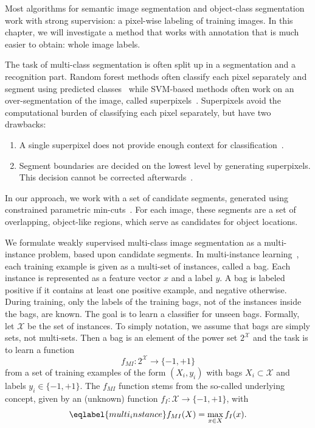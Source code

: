 Most algorithms for semantic image segmentation and object-class segmentation work with strong supervision: a pixel-wise labeling
of training images. In this chapter, we will investigate a method that works with annotation
that is much easier to obtain: whole image labels.


The task of multi-class segmentation is often split up in a segmentation
and a recognition part. Random forest methods often classify each pixel
separately and segment using predicted classes~\citep{schroff2008object} while SVM-based methods often work on an
over-segmentation of the image, called superpixels~\citep{ladicky2009associative,gonfaus2010harmony}. Superpixels avoid the
computational burden of classifying each pixel separately, but have
two drawbacks:
\begin{enumerate}
    \item A single superpixel does not provide enough context for classification~\citep{fulkerson2009class}.
    \item Segment boundaries are decided on the lowest level by generating
        superpixels. This decision cannot be corrected afterwards~\citep{hanbury2008superpixels}.
\end{enumerate}
In our approach, we work with a set of candidate segments, generated using constrained parametric min-cuts~\citep{carreira2010constrained}.
For each image, these segments are a set of overlapping, object-like regions, which serve
as candidates for object locations.

We formulate weakly supervised multi-class image segmentation as a multi-instance problem, based upon candidate segments.
In multi-instance learning~\citep{dietterich1997solving}, each training example is given as a multi-set of instances, called a bag.
Each instance is represented as a feature vector $x$ and a label $y$.
A bag is labeled positive if it contains at least one positive example, and negative otherwise.
During training, only the labels of the training bags, not of the instances inside the bags, are known.
The goal is to learn a classifier for unseen bags. 
Formally, let $\mathcal{X}$ be the set of instances. To simply notation, we assume that bags are simply sets, not multi-sets.
Then a bag is an element of the power set $2^\mathcal{X}$ and the task is
to learn a function
\begin{equation} f_{MI} \colon 2^\mathcal{X} \rightarrow \{-1,+1\}  \end{equation}
from a set of training examples of the form $(X_i,y_i)$ with bags $X_i \subset \mathcal{X}$ and labels $y_i \in \{-1,+1\}$.
The $f_{MI}$ function stems from the so-called underlying concept, given by an (unknown) function
$f_{I} \colon \mathcal{X} \rightarrow \{-1,+1\}$, with 
\begin{equation}\eqlabel{multi_instance}
f_{MI}(X)= \max_{x \in X} f_{I}(x).
\end{equation}

